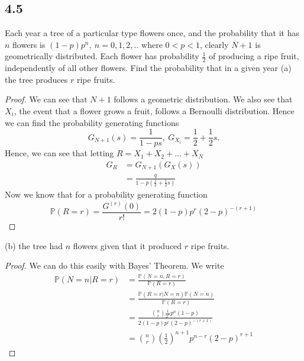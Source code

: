 \documentclass{article}
\renewcommand{\P}[1]{\mathbb{P}(#1)}
\begin{document}
\subsection*{4.5} %
Each year a tree of a particular type flowers once, and the probability that it has
$n$ flowers is $(1-p)p^n, \ n = 0,1,2,..$ where $0 < p < 1$, clearly $N + 1$ is
geometrically distributed.
Each flower has probability $\frac{1}{2}$ of producing a ripe fruit, independently
of all other flowers. Find the probability that in a given year
(a) the tree produces $r$ ripe fruits.
\begin{proof}
    We can see that $N+1$ follows a geometric distribution. We also see that $X_i$, the
    event that a flower grows a fruit, follows a Bernoulli distribution. Hence we can
    find the probability generating functions
    $$G_{N+1} (s) = \frac{1}{1-ps}, \ G_{X_i} = \frac{1}{2} + \frac{1}{2}s.$$
    Hence, we can see that letting $R= X_1 + X_2 + ... + X_N$
    \begin{align*}
        G_R & = G_{N+1}(G_X(s))                             \\
            & = \frac{q}{1 - p(\frac{1}{2} + \frac{1}{2}s)}
    \end{align*}
    Now we know that for a probability generating function
    $$\P{R=r} = \frac{G^{(r)}(0)}{r!} = 2(1-p)p^r(2-p)^{-(r+1)}$$
\end{proof}
(b) the tree had $n$ flowers given that it produced $r$ ripe fruits.
\begin{proof}
    We can do this easily with Bayes' Theorem. We write
    \begin{align*}
        \P{N=n | R = r} & = \frac{\P{N=n, R=r}}{\P{R = r}}                                    \\
                        & = \frac{\P{R=r | N=n}\P{N=n}}{\P{R=r}}                              \\
                        & = \frac{\binom{n}{r}\frac{1}{2^n}p^n(1-p)}{2(1-p)p^r(2-p)^{-(r+1)}} \\
                        & = \binom{n}{r}\left(\frac{1}{2}\right)^{n+1}p^{n-r}(2-p)^{r+1}
    \end{align*}
\end{proof}
\end{document}
